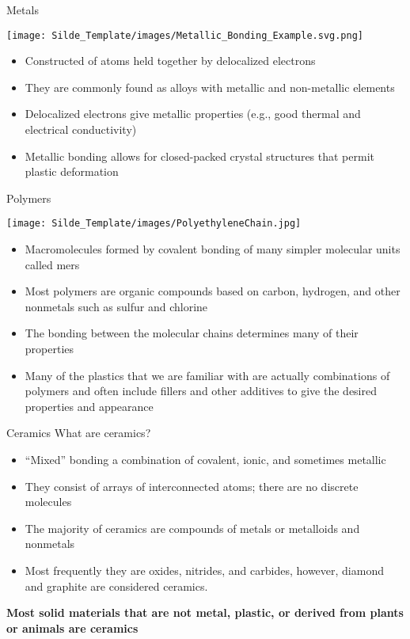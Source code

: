 \documentclass{libs/XJTLU_format}
\begin{document}
\begin{frame}{Metals}

\centering
\texttt{[image: Silde\_Template/images/Metallic\_Bonding\_Example.svg.png]}

\begin{itemize}
    \item Constructed of atoms held together by delocalized electrons
    \pause
    \item They are commonly found as alloys with metallic and non-metallic elements
    \pause
    \item Delocalized electrons give metallic properties (e.g., good thermal and electrical conductivity)
    \pause
    \item Metallic bonding allows for closed-packed crystal structures that permit plastic deformation
\end{itemize}
    
\end{frame}

\begin{frame}{Polymers}

\centering
\texttt{[image: Silde\_Template/images/PolyethyleneChain.jpg]}

\begin{itemize}
    \item Macromolecules formed by covalent bonding of many simpler molecular units called mers 
    \pause
    \item Most polymers are organic compounds based on carbon, hydrogen, and other nonmetals such as sulfur and chlorine 
    \pause
    \item The bonding between the molecular chains determines many of their properties
    \pause
    \item Many of the plastics that we are familiar with are actually combinations of polymers and often include fillers and other additives to give the desired properties and appearance
\end{itemize}
\end{frame}

\begin{frame}{Ceramics}
What are ceramics? 
\pause
\vspace{1em}

\begin{itemize}
    \item “Mixed” bonding a combination of covalent, ionic, and sometimes metallic
    \pause
    \item They consist of arrays of interconnected atoms; there are no discrete molecules
    \item The majority of ceramics are compounds of metals or metalloids and nonmetals
    \pause
    \item Most frequently they are oxides, nitrides, and carbides, however, diamond and graphite are considered ceramics.
\end{itemize}
\pause

\vspace{1em}
\textbf{Most solid materials that are not metal, plastic, or derived from plants or animals are ceramics}

\end{frame}
\end{document}
